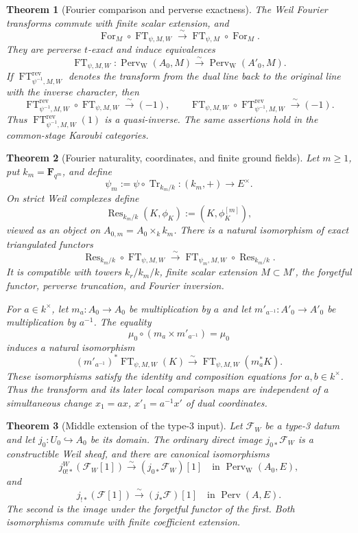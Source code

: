 \documentclass[10pt]{article}
\newtheorem{theorem}{Theorem}[section]
\theoremstyle{definition}
\newcommand{\FT}{\operatorname{FT}}
\begin{document}
\begin{theorem}[Fourier comparison and perverse exactness]
The Weil Fourier transforms commute with finite scalar extension, and
\[
 \operatorname{For}_M\circ\FT_{\psi,M,W}
   \xrightarrow{\sim}
 \FT_{\psi,M}\circ\operatorname{For}_M.
\]
They are perverse \(t\)-exact and induce equivalences
\[
 \FT_{\psi,M,W}:\operatorname{Perv}_{\mathrm W}(A_0,M)
   \xrightarrow{\sim}\operatorname{Perv}_{\mathrm W}(A'_0,M).
\]
If \(\FT^{\mathrm{rev}}_{\psi^{-1},M,W}\) denotes the transform from the
dual line back to the original line with the inverse character, then
\[
 \FT^{\mathrm{rev}}_{\psi^{-1},M,W}\circ\FT_{\psi,M,W}
   \xrightarrow{\sim}(-1),\qquad
 \FT_{\psi,M,W}\circ\FT^{\mathrm{rev}}_{\psi^{-1},M,W}
   \xrightarrow{\sim}(-1).
\]
Thus \(\FT^{\mathrm{rev}}_{\psi^{-1},M,W}(1)\) is a quasi-inverse.
The same assertions hold in the common-stage Karoubi categories.
\end{theorem}

\begin{theorem}[Fourier naturality, coordinates, and finite ground fields]
Let \(m\geq1\), put \(k_m=\mathbf F_{q^m}\), and define
\[
 \psi_m:=\psi\circ\operatorname{Tr}_{k_m/k}:(k_m,+)\longrightarrow E^\times.
\]
On strict Weil complexes define
\[
 \operatorname{Res}_{k_m/k}(K,\phi_K):=(K,\phi_K^{[m]}),
\]
viewed as an object on \(A_{0,m}=A_0\times_k k_m\).  There is a natural
isomorphism of exact triangulated functors
\[
 \operatorname{Res}_{k_m/k}\circ\FT_{\psi,M,W}
 \xrightarrow{\sim}
 \FT_{\psi_m,M,W}\circ\operatorname{Res}_{k_m/k}.
\]
It is compatible with towers \(k_r/k_m/k\), finite scalar extension
\(M\subset M'\), the forgetful functor, perverse truncation, and Fourier
inversion.

For \(a\in k^\times\), let \(m_a:A_0\to A_0\) be multiplication by \(a\)
and let \(m'_{a^{-1}}:A'_0\to A'_0\) be multiplication by \(a^{-1}\).
The equality
\[
 \mu_0\circ(m_a\times m'_{a^{-1}})=\mu_0
\]
induces a natural isomorphism
\[
 (m'_{a^{-1}})^*\FT_{\psi,M,W}(K)
 \xrightarrow{\sim}
 \FT_{\psi,M,W}(m_a^*K).
\]
These isomorphisms satisfy the identity and composition equations for
\(a,b\in k^\times\).  Thus the transform and its later local comparison
maps are independent of a simultaneous change \(x_1=ax\),
\(x'_1=a^{-1}x'\) of dual coordinates.
\end{theorem}

\begin{theorem}[Middle extension of the type-3 input]
Let \(\mathcal F_W\) be a type-3 datum and let
\(j_0:U_0\hookrightarrow A_0\) be its domain.  The ordinary direct image
\(j_{0*}\mathcal F_W\) is a constructible Weil sheaf, and there are
canonical isomorphisms
\[
 j^W_{0!*}(\mathcal F_W[1])
 \xrightarrow{\sim}(j_{0*}\mathcal F_W)[1]
 \quad\text{in }\operatorname{Perv}_{\mathrm W}(A_0,E),
\]
and
\[
 j_{!*}(\mathcal F[1])
 \xrightarrow{\sim}(j_*\mathcal F)[1]
 \quad\text{in }\operatorname{Perv}(A,E).
\]
The second is the image under the forgetful functor of the first.  Both
isomorphisms commute with finite coefficient extension.
\end{theorem}
\end{document}
